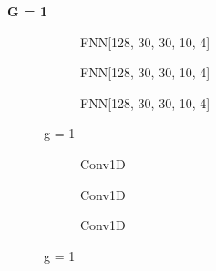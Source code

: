 \documentclass[a4paper,times,12pt]{article}
\begin{document}
\textbf{G = 1}

\begin{figure}[H]
    \centering
    \begin{subfigure}[t]{0.45\textwidth}
		\centering
        
        \caption{FNN[128, 30, 30, 10, 4]}
		\label{fig:a}
    \end{subfigure}\hfill
    \begin{subfigure}[t]{0.45\textwidth}
		\centering
        
        \caption{FNN[128, 30, 30, 10, 4]}
		\label{fig:b}
    \end{subfigure}\hfill    
    \begin{subfigure}[t]{0.45\textwidth}
        \centering
        
        \caption{FNN[128, 30, 30, 10, 4]}
		\label{fig:c}
    \end{subfigure}
	\caption{g = 1}
\end{figure}


\begin{figure}[H]
    \centering
    \begin{subfigure}[t]{0.45\textwidth}
		\centering
        
        \caption{Conv1D}
		\label{fig:a}
    \end{subfigure}\hfill
    \begin{subfigure}[t]{0.45\textwidth}
		\centering
        
        \caption{Conv1D}
		\label{fig:b}
    \end{subfigure}\hfill    
    \begin{subfigure}[t]{0.45\textwidth}
        \centering
        
        \caption{Conv1D}
		\label{fig:c}
    \end{subfigure}
	\caption{g = 1}
\end{figure}
\end{document}
